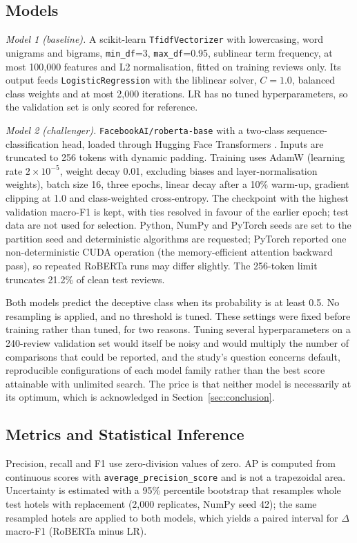 \subsection{Models}
\emph{Model 1 (baseline).} A scikit-learn \texttt{TfidfVectorizer} with lowercasing, word unigrams and bigrams, \texttt{min\_df}=3, \texttt{max\_df}=0.95, sublinear term frequency, at most 100,000 features and L2 normalisation, fitted on training reviews only. Its output feeds \texttt{LogisticRegression} with the liblinear solver, $C=1.0$, balanced class weights and at most 2,000 iterations. LR has no tuned hyperparameters, so the validation set is only scored for reference.

\emph{Model 2 (challenger).} \texttt{FacebookAI/roberta-base} \cite{liu2019roberta} with a two-class sequence-classification head, loaded through Hugging Face Transformers \cite{wolf2020}. Inputs are truncated to 256 tokens with dynamic padding. Training uses AdamW (learning rate $2\times10^{-5}$, weight decay 0.01, excluding biases and layer-normalisation weights), batch size 16, three epochs, linear decay after a 10\% warm-up, gradient clipping at 1.0 and class-weighted cross-entropy. The checkpoint with the highest validation macro-F1 is kept, with ties resolved in favour of the earlier epoch; test data are not used for selection. Python, NumPy and PyTorch seeds are set to the partition seed and deterministic algorithms are requested; PyTorch reported one non-deterministic CUDA operation (the memory-efficient attention backward pass), so repeated RoBERTa runs may differ slightly. The 256-token limit truncates 21.2\% of clean test reviews.

Both models predict the deceptive class when its probability is at least 0.5. No resampling is applied, and no threshold is tuned. These settings were fixed before training rather than tuned, for two reasons. Tuning several hyperparameters on a 240-review validation set would itself be noisy and would multiply the number of comparisons that could be reported, and the study's question concerns default, reproducible configurations of each model family rather than the best score attainable with unlimited search. The price is that neither model is necessarily at its optimum, which is acknowledged in Section~\ref{sec:conclusion}.

\subsection{Metrics and Statistical Inference}
Precision, recall and F1 use zero-division values of zero. AP is computed from continuous scores with \texttt{average\_precision\_score} and is not a trapezoidal area. Uncertainty is estimated with a 95\% percentile bootstrap that resamples whole test hotels with replacement (2,000 replicates, NumPy seed 42); the same resampled hotels are applied to both models, which yields a paired interval for $\Delta$macro-F1 (RoBERTa minus LR).

